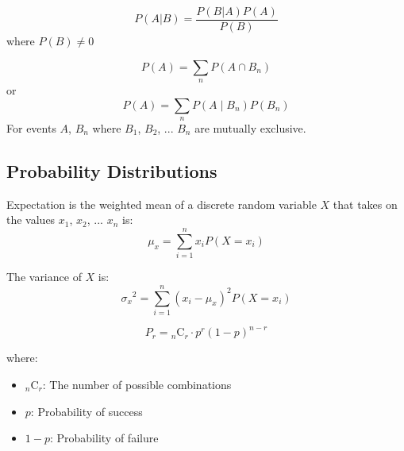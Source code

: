 \documentclass[11pt]{article}
\newcommand{\comb}[2]{{}_{#1}\mathrm{C}_{#2}}
\begin{document}
\begin{definition}\label{def:bayes-thm}
    \begin{equation*}
        P(A | B) = \frac{P(B | A) P(A)}{P(B)}
    \end{equation*}
    where $P(B) \neq 0$
\end{definition}

\begin{definition}\label{def:law-total-prob}
    \begin{equation*}
        P(A) = \sum_n P(A \cap B_n)
    \end{equation*}
    or 
    \begin{equation*}
        P(A) = \sum_n P(A \mid B_n) P(B_n)
    \end{equation*}
    For events $A$, $B_n$ where $B_1$, $B_2$, ... $B_n$ are mutually exclusive.
\end{definition}

\subsection{Probability Distributions}

\begin{definition}[Expectation]\label{def:expectation}
    Expectation is the weighted mean of a discrete random variable $X$
    that takes on the values $x_1$, $x_2$, ... $x_n$ is:
    \begin{equation*}
        \mu_x = \sum_{i = 1}^n x_i P(X = x_i)
    \end{equation*}

    The variance of $X$ is:
    \begin{equation*}
        {\sigma_x}^2 = \sum_{i = 1}^n (x_i - \mu_x)^2 P(X = x_i)
    \end{equation*}
\end{definition}

\begin{definition}\label{def:binom-prob}
    \begin{equation*}
        P_r = \comb{n}{r} \cdot p^r (1 - p)^{n-r}
    \end{equation*}

    where:

    \begin{itemize}
        \item $\comb{n}{r}$: The number of possible combinations
        \item $p$: Probability of success
        \item $1 - p$: Probability of failure
    \end{itemize}
\end{definition}
\end{document}
